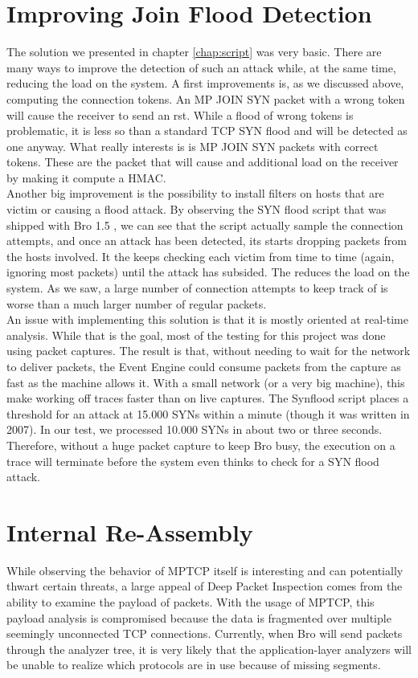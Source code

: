 \section{Improving Join Flood Detection}
The solution we presented in chapter \ref{chap:script} was very basic. There are many ways to improve the detection of such an attack while, at the same time, reducing the load on the system. A first improvements is, as we discussed above, computing the connection tokens. An MP JOIN SYN packet with a wrong token will cause the receiver to send an rst. While a flood of wrong tokens is problematic, it is less so than a standard TCP SYN flood and will be detected as one anyway. What really interests is is MP JOIN SYN packets with correct tokens. These are the packet that will cause and additional load on the receiver by making it compute a HMAC. \\

Another big improvement is the possibility to install filters on hosts that are victim or causing a flood attack. By observing the SYN flood script that was shipped with Bro 1.5 \cite{synflood}, we can see that the script actually sample the connection attempts, and once an attack has been detected, its starts dropping packets from the hosts involved. It the keeps checking each victim from time to time (again, ignoring most packets) until the attack has subsided. The reduces the load on the system. As we saw, a large number of connection attempts to keep track of is worse than a much larger number of regular packets. \\

An issue with implementing this solution is that it is mostly oriented at real-time analysis. While that is the goal, most of the testing for this project was done using packet captures. The result is that, without needing to wait for the network to deliver packets, the Event Engine could consume packets from the capture as fast as the machine allows it. With a small network (or a very big machine), this make working off traces faster than on live captures. The Synflood script places a threshold for an attack at 15.000 SYNs within a minute (though it was written in 2007). In our test, we processed 10.000 SYNs in about two or three seconds. Therefore, without a huge packet capture to keep Bro busy, the execution on a trace will terminate before the system even thinks to check for a SYN flood attack.

\section{Internal Re-Assembly}
While observing the behavior of MPTCP itself is interesting and can potentially thwart certain threats, a large appeal of Deep Packet Inspection comes from the ability to examine the payload of packets. With the usage of MPTCP, this payload analysis is compromised because the data is fragmented over multiple seemingly unconnected TCP connections. Currently, when Bro will send packets through the analyzer tree, it is very likely that the application-layer analyzers will be unable to realize which protocols are in use because of missing segments. \\

